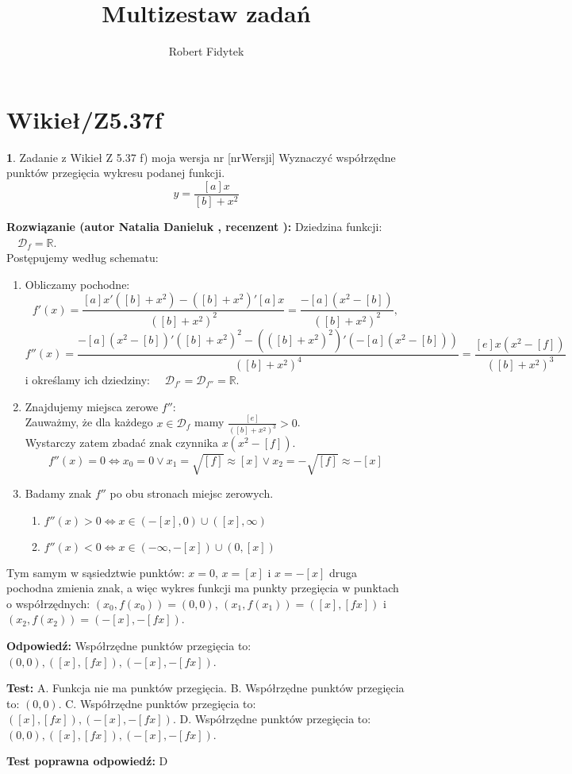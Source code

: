 \documentclass[12pt, a4paper]{article}
\title{Multizestaw zadań}
\author{Robert Fidytek}
\date{}
\theoremstyle{definition} %
\newtheorem{zad}{}
\newcommand{\kategoria}[1]{\section{#1}} %
\newcommand{\zadStart}[1]{\begin{zad}#1\newline} %
\newcommand{\zadStop}{\end{zad}}   %
\newcommand{\rozwStart}[2]{\noindent \textbf{Rozwiązanie (autor #1 , recenzent #2): }\newline} %
\newcommand{\rozwStop}{\newline}                                            %
\newcommand{\odpStart}{\noindent \textbf{Odpowiedź:}\newline}    %
\newcommand{\odpStop}{\newline}                                             %
\newcommand{\testStart}{\noindent \textbf{Test:}\newline} %
\newcommand{\testStop}{\newline} %
\newcommand{\kluczStart}{\noindent \textbf{Test poprawna odpowiedź:}\newline} %
\newcommand{\kluczStop}{\newline} %
\begin{document}
\maketitle

\kategoria{Wikieł/Z5.37f}

\zadStart{Zadanie z Wikieł Z 5.37 f) moja wersja nr [nrWersji]}
Wyznaczyć współrzędne punktów przegięcia wykresu podanej funkcji.
$$y = \frac{[a]x}{[b] + x^2}$$
\zadStop

\rozwStart{Natalia Danieluk}{}
Dziedzina funkcji: $\quad \mathcal{D}_f=\mathbb{R}$. \\
Postępujemy według schematu:
\begin{enumerate}
\item Obliczamy pochodne: 
$$f'(x) = \frac{[a]x'([b] + x^2) - ([b] + x^2)'[a]x}{([b] + x^2)^2} = \frac{-[a](x^2-[b])}{([b] + x^2)^2},$$
$$f''(x) = \frac{-[a](x^2-[b])'([b] + x^2)^2 - (([b] + x^2)^2)'(-[a](x^2-[b]))}{([b] + x^2)^4} = \frac{[e]x(x^2-[f])}{([b] + x^2)^3}$$
i określamy ich dziedziny: $\quad \mathcal{D}_{f'}=\mathcal{D}_{f''}=\mathbb{R}$. \\
\item Znajdujemy miejsca zerowe $f''$: \\
Zauważmy, że dla każdego $x \in \mathcal{D}_f$ mamy $\frac{[e]}{([b] + x^2)^3} > 0$. \\
Wystarczy zatem zbadać znak czynnika $x(x^2-[f])$. \\
$$f''(x)=0 \Leftrightarrow x_0=0 \vee x_1=\sqrt{[f]}\approx[x] \vee x_2=-\sqrt{[f]}\approx-[x]$$
\item Badamy znak $f''$ po obu stronach miejsc zerowych. \\
	\begin{enumerate}
	\item $f''(x) > 0 \Leftrightarrow x \in (-[x],0)\cup([x],\infty)$\\
	\item $f''(x) < 0 \Leftrightarrow x \in (-\infty,-[x])\cup(0,[x])$
	\end{enumerate}
\end{enumerate}
Tym samym w sąsiedztwie punktów: $x=0$, $x=[x]$ i $x=-[x]$ druga pochodna zmienia znak, a więc wykres funkcji ma punkty przegięcia w punktach o współrzędnych: $(x_0,f(x_0)) = (0,0)$, $(x_1,f(x_1)) = ([x],[fx])$ i $(x_2,f(x_2)) = (-[x],-[fx])$.
\rozwStop

\odpStart
Współrzędne punktów przegięcia to: $(0,0), ([x],[fx]), (-[x],-[fx])$.
\odpStop

\testStart
A. Funkcja nie ma punktów przegięcia.
B. Współrzędne punktów przegięcia to: $(0,0)$.
C. Współrzędne punktów przegięcia to:  $([x],[fx]), (-[x],-[fx])$.
D. Współrzędne punktów przegięcia to:  $(0,0), ([x],[fx]), (-[x],-[fx])$.
\testStop

\kluczStart
D
\kluczStop
\end{document}
